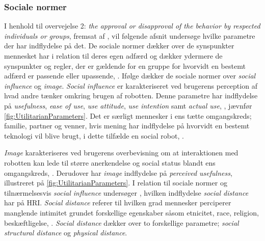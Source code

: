 \subsubsection*{Sociale normer}
\label{InteraktionSocialeRobotterParametreSocialeNormer}
% 
I henhold til overvejelse 2: \textit{the approval or disapproval of the behavior by respected individuals or groups}, fremsat af \textcite[s. 1477]{PDF:SharingALifeHarvey}, vil følgende afsnit undersøge hvilke parametre der har indflydelse på det.\blankline
%
De sociale normer dækker over de synspunkter mennesket har i relation til deres egen adfærd og dækker ydermere de synspunkter og regler, der er gældende for en gruppe for hvorvidt en bestemt adfærd er passende eller upassende, \parencite[s. 1478]{PDF:ExploringInfluencingVariable}. Ifølge \textcite[s. 1478]{PDF:ExploringInfluencingVariable} dækker de sociale normer over \textit{social influence} og \textit{image}. \textit{Social influence} er karakteriseret ved brugerens perception af hvad andre tænker omkring brugen af robotten. Denne parametre har indflydelse på \textit{usefulness}, \textit{ease of use}, \textit{use attitude}, \textit{use intention} samt \textit{actual use}, \parencite[s. 1478]{PDF:ExploringInfluencingVariable}, jævnfør \autoref{fig:UtilitarianParameters}. Det er særligt mennesker i ens tætte omgangskreds; familie, partner og venner, hvis mening har indflydelse på hvorvidt en bestemt teknologi vil blive brugt, i dette tilfælde en social robot, \parencite[s. 1478]{PDF:ExploringInfluencingVariable}. 

\textit{Image} karakteriseres ved brugerens overbevisning om at interaktionen med robotten kan lede til større anerkendelse og social status blandt ens omgangskreds, \parencite[s. 1478]{PDF:ExploringInfluencingVariable}. Derudover har \textit{image} indflydelse på \textit{perceived usefulness}, illustreret på \autoref{fig:UtilitarianParameters}.\blankline
%
I relation til sociale normer og tilnærmelsesvis \textit{social influence} undersøger \textcite{PDF:HowSocialDistanceShapesHRI}, hvilken indflydelse \textit{social distance} har på HRI. \textit{Social distance} referer til hvilken grad mennesker perciperer manglende intimitet grundet forskellige egenskaber såsom etnicitet, race, religion, beskæftligelse, \parencite[s. 784]{PDF:HowSocialDistanceShapesHRI}. \textit{Social distance} dækker over to forskellige parametre; \textit{social structural distance} og \textit{physical distance}.

